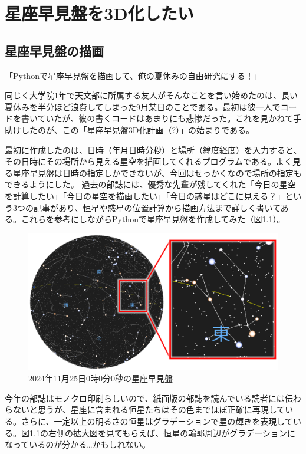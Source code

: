 \documentclass[../main]{subfiles}
\begin{document}
\chapter{星座早見盤を3D化したい} %


\section{星座早見盤の描画}
「Pythonで星座早見盤を描画して、俺の夏休みの自由研究にする！」

同じく大学院1年で天文部に所属する友人がそんなことを言い始めたのは、長い夏休みを半分ほど浪費してしまった9月某日のことである。最初は彼一人でコードを書いていたが、彼の書くコードはあまりにも悲惨だった。これを見かねて手助けしたのが、この「星座早見盤3D化計画（?）」の始まりである。

最初に作成したのは、日時（年月日時分秒）と場所（緯度経度）を入力すると、その日時にその場所から見える星空を描画してくれるプログラムである。よく見る星座早見盤は日時の指定しかできないが、今回はせっかくなので場所の指定もできるようにした。
過去の部誌には、優秀な先輩が残してくれた「今日の星空を計算したい\cite{bib01}」「今日の星空を描画したい\cite{bib02}」「今日の惑星はどこに見える？\cite{bib03}」という3つの記事があり、恒星や惑星の位置計算から描画方法まで詳しく書いてある。これらを参考にしながらPythonで星座早見盤を作成してみた（図\ref{fig01}）。
\begin{figure}[H]
  \centering
  \label{fig01}
  \includegraphics[width=15cm]{sections/Fujisawa/image/planisphere_normal.png}
  \caption{2024年11月25日0時0分0秒の星座早見盤}
\end{figure}
今年の部誌はモノクロ印刷らしいので、紙面版の部誌を読んでいる読者には伝わらないと思うが、星座に含まれる恒星たちはその色までほぼ正確に再現している。さらに、一定以上の明るさの恒星はグラデーションで星の輝きを表現している。図\ref{fig01}の右側の拡大図を見てもらえば、恒星の輪郭周辺がグラデーションになっているのが分かる…かもしれない。
\end{document}
